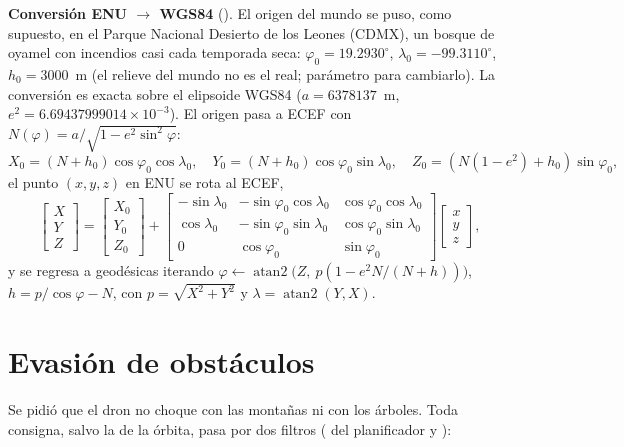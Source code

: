 \textbf{Conversión ENU $\rightarrow$ WGS84} (). El origen del mundo se puso, como
supuesto, en el Parque Nacional Desierto de los Leones (CDMX), un bosque de oyamel con incendios
casi cada temporada seca: $\varphi_0 = 19.2930^\circ$, $\lambda_0 = -99.3110^\circ$, $h_0 = 3000$~m (el
relieve del mundo no es el real; parámetro  para cambiarlo). La conversión es
exacta sobre el elipsoide WGS84 ($a = 6378137$~m, $e^2 = 6.69437999014\times10^{-3}$). El origen
pasa a ECEF con $N(\varphi) = a/\sqrt{1-e^2\sin^2\varphi}$:
\begin{equation}
X_0 = (N+h_0)\cos\varphi_0\cos\lambda_0,\quad
Y_0 = (N+h_0)\cos\varphi_0\sin\lambda_0,\quad
Z_0 = (N(1-e^2)+h_0)\sin\varphi_0 ,
\end{equation}
el punto $(x,y,z)$ en ENU se rota al ECEF,
\begin{equation}
\begin{bmatrix}X\\Y\\Z\end{bmatrix} = \begin{bmatrix}X_0\\Y_0\\Z_0\end{bmatrix} +
\begin{bmatrix}
-\sin\lambda_0 & -\sin\varphi_0\cos\lambda_0 & \cos\varphi_0\cos\lambda_0\\
\cos\lambda_0 & -\sin\varphi_0\sin\lambda_0 & \cos\varphi_0\sin\lambda_0\\
0 & \cos\varphi_0 & \sin\varphi_0
\end{bmatrix}
\begin{bmatrix}x\\y\\z\end{bmatrix},
\end{equation}
y se regresa a geodésicas iterando $\varphi \leftarrow \operatorname{atan2}\big(Z,\ p(1 - e^2N/(N+h))\big)$,
$h = p/\cos\varphi - N$, con $p = \sqrt{X^2+Y^2}$ y $\lambda = \operatorname{atan2}(Y, X)$.

\section{Evasión de obstáculos}

Se pidió que el dron no choque con las montañas ni con los árboles. Toda consigna, salvo la de la
órbita, pasa por dos filtros ( del planificador y ):

